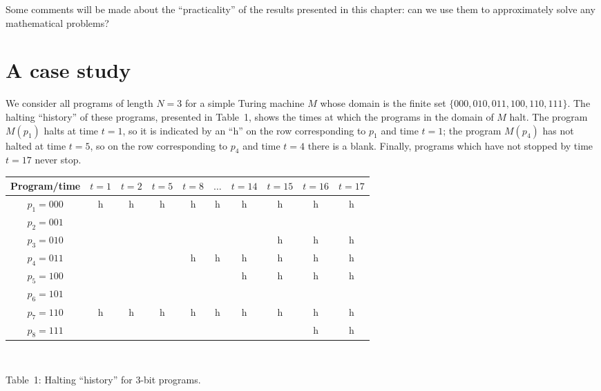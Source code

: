 \documentclass[12pt,twoside,openright]{report}
\begin{document}
Some comments will be made about the ``practicality'' of the results presented in this chapter: can we use them to approximately solve any mathematical problems?

\section{A case study}

We consider all programs of length $N=3$ for a simple Turing machine $M$  whose domain is the finite set $\{000,010,011,100,110,111\}$. The halting ``history'' of these programs, presented in Table~1, shows the times at which the programs in the domain of $M$ halt. The program $M(p_{1})$ halts at time $t=1$, so it is indicated by an ``h'' on the row corresponding to $p_{1}$ and time $t=1$; the program $M(p_{4})$ has not halted at time $t=5$, so on the row corresponding to $p_{4}$ and time $t=4$ there is a blank. Finally, programs which have not stopped by time $t=17$ never stop.

\begin{center}
\begin{tabular}{|c|c|c|c|c|c|c|c|c|c|}\hline Program/time & $t=1$ & $t=2$ & $t=5$ & $t=8$ & $\ldots$ & $ t=14$ & $t=15$ & $t=16$ & $t=17$\\
\hline
$p_{1}=000$ & h & h & h & h & h & h & h & h & h \\
\hline
$p_{2}=001$ &   &   &   &   &   &   &   &   &  \\
\hline
$p_{3}=010$ &   &   &   &   &   &   & h & h & h \\
\hline
$p_{4}=011$ &   &   &   & h & h & h & h & h & h \\
\hline                              
$p_{5}=100$ &   &   &   &   &   & h & h & h & h \\
\hline
$p_{6}=101$ &   &   &   &   &   &   &   &   &  \\
\hline
$p_{7}=110$ & h & h & h & h & h & h & h & h & h \\
\hline
$p_{8}=111$ &   &   &   &   &   &   &   & h & h\\
\hline\end{tabular}\\

\bigskip

Table~1:  Halting  ``history'' for 3-bit programs.
\end{center}
\end{document}

